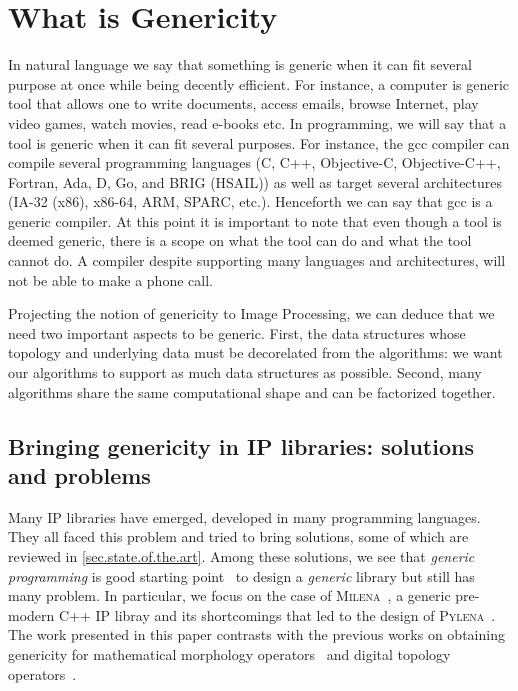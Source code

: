 \chapter{What is Genericity}

In natural language we say that something is generic when it can fit several purpose at once while being decently
efficient. For instance, a computer is generic tool that allows one to write documents, access emails, browse Internet,
play video games, watch movies, read e-books etc. In programming, we will say that a tool is generic when it can fit
several purposes. For instance, the gcc compiler can compile several programming languages (C, C++, Objective-C,
Objective-C++, Fortran, Ada, D, Go, and BRIG (HSAIL)) as well as target several architectures (IA-32 (x86), x86-64, ARM,
SPARC, etc.). Henceforth we can say that gcc is a generic compiler. At this point it is important to note that even
though a tool is deemed generic, there is a scope on what the tool can do and what the tool cannot do. A compiler
despite supporting many languages and architectures, will not be able to make a phone call.

Projecting the notion of genericity to Image Processing, we can deduce that we need two important aspects to be generic.
First, the data structures whose topology and underlying data must be decorelated from the algorithms: we want our
algorithms to support as much data structures as possible. Second, many algorithms share the same computational shape
and can be factorized together.

\section{Bringing genericity in IP libraries: solutions and problems}

Many IP libraries have emerged, developed in many programming
languages. They all faced this problem and tried to bring solutions,
some of which are reviewed in \cref{sec.state.of.the.art}. Among these
solutions, we see that \emph{generic programming} is good starting
point~\cite{geraud.2000.icpr} to design a \emph{generic} library but
still has many problem. In particular, we focus on the case of
\textsc{Milena}~\cite{levillain.2010.icip, geraud2012ipolmeeting}, a generic 
pre-modern C++ IP libray and its shortcomings that led to the design of 
\textsc{Pylena}~\cite{carlinet2018pylena}.  The work presented in this paper 
contrasts with the previous works on obtaining genericity for mathematical 
morphology operators~\cite{darbon.2002.ismm,levillain.2009.ismm} and digital 
topology operators~\cite{levillain.2012.wadgmm}.





